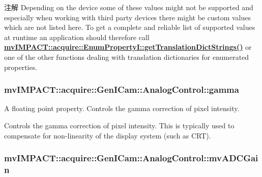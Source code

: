 \begin{DoxyNote}{注解}
Depending on the device some of these values might not be supported and especially when working with third party devices there might be custom values which are not listed here. To get a complete and reliable list of supported values at runtime an application should therefore call {\bfseries \hyperlink{classmv_i_m_p_a_c_t_1_1acquire_1_1_enum_property_i_a0ba6ccbf5ee69784d5d0b537924d26b6}{mv\+I\+M\+P\+A\+C\+T\+::acquire\+::\+Enum\+Property\+I\+::get\+Translation\+Dict\+Strings()}} or one of the other functions dealing with translation dictionaries for enumerated properties. 
\end{DoxyNote}
\hypertarget{classmv_i_m_p_a_c_t_1_1acquire_1_1_gen_i_cam_1_1_analog_control_a89e3cff9a396ada4e88cc4910b5b03fb}{
\subsubsection[{gamma}]{ mv\+I\+M\+P\+A\+C\+T\+::acquire\+::\+Gen\+I\+Cam\+::\+Analog\+Control\+::gamma}}\label{classmv_i_m_p_a_c_t_1_1acquire_1_1_gen_i_cam_1_1_analog_control_a89e3cff9a396ada4e88cc4910b5b03fb}


A floating point property. Controls the gamma correction of pixel intensity. 

Controls the gamma correction of pixel intensity. This is typically used to compensate for non-\/linearity of the display system (such as C\+R\+T). \hypertarget{classmv_i_m_p_a_c_t_1_1acquire_1_1_gen_i_cam_1_1_analog_control_acd17e28f62d7d954aaaf114b9f30cde0}{
\subsubsection[{mv\+A\+D\+C\+Gain}]{ mv\+I\+M\+P\+A\+C\+T\+::acquire\+::\+Gen\+I\+Cam\+::\+Analog\+Control\+::mv\+A\+D\+C\+Gain}}\label{classmv_i_m_p_a_c_t_1_1acquire_1_1_gen_i_cam_1_1_analog_control_acd17e28f62d7d954aaaf114b9f30cde0}


